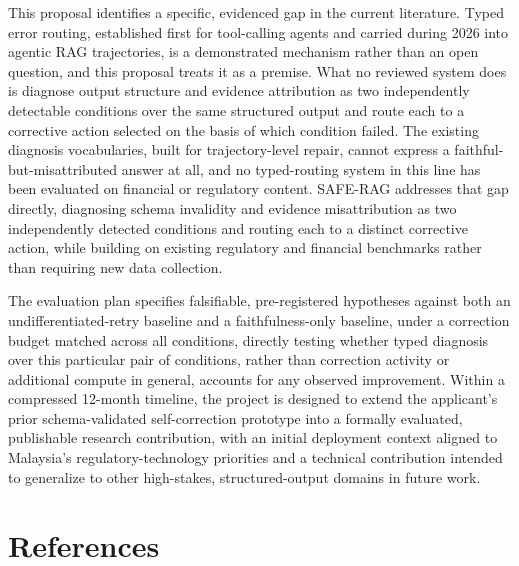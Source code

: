 \documentclass[11pt,a4paper]{article}
\begin{document}
This proposal identifies a specific, evidenced gap in the current literature. Typed error
routing, established first for tool-calling agents and carried during 2026 into agentic
RAG trajectories, is a demonstrated mechanism rather than an open question, and this
proposal treats it as a premise. What no reviewed system does is diagnose output structure
and evidence attribution as two independently detectable conditions over the same
structured output and route each to a corrective action selected on the basis of which
condition failed. The existing diagnosis vocabularies, built for trajectory-level repair,
cannot express a faithful-but-misattributed answer at all, and no typed-routing system in
this line has been evaluated on financial or regulatory content. SAFE-RAG addresses that
gap directly, diagnosing schema invalidity and evidence misattribution as two independently
detected conditions and routing each to a distinct corrective action, while building on
existing regulatory and financial benchmarks rather than requiring new data collection.

The evaluation plan specifies falsifiable, pre-registered hypotheses against both an
undifferentiated-retry baseline and a faithfulness-only baseline, under a correction budget
matched across all conditions, directly testing whether typed diagnosis over this
particular pair of conditions, rather than correction activity or additional compute in
general, accounts for any observed improvement. Within a compressed 12-month timeline, the
project is designed to extend the applicant's prior schema-validated self-correction
prototype into a formally evaluated, publishable research contribution, with an initial
deployment context aligned to Malaysia's regulatory-technology priorities and a technical
contribution intended to generalize to other high-stakes, structured-output domains in
future work.

\section*{References}
\end{document}
